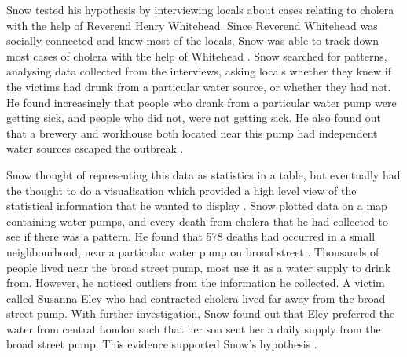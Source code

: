 \documentclass[12pt]{article}
\begin{document}
Snow tested his hypothesis by interviewing locals about cases relating to cholera with the help of Reverend Henry Whitehead. Since Reverend Whitehead was socially connected and knew most of the locals, Snow was able to track down most cases of cholera with the help of Whitehead \cite{tedtalk}. Snow searched for patterns, analysing data collected from the interviews, asking locals whether they knew if the victims had drunk from a particular water source, or whether they had not. He found increasingly that people who drank from a particular water pump were getting sick, and people who did not, were not getting sick. He also found out that a brewery and workhouse both located near this pump had independent water sources escaped the outbreak \cite{blog}.

Snow thought of representing this data as statistics in a table, but eventually had the thought to do a visualisation which provided a high level view of the statistical information that he wanted to display \cite{tedtalk}. Snow plotted data on a map containing water pumps, and every death from cholera that he had collected to see if there was a pattern. He found that 578 deaths had occurred in a small neighbourhood, near a particular water pump on broad street \cite{channel1}. Thousands of people lived near the broad street pump, most use it as a water supply to drink from. However, he noticed outliers from the information he collected. A victim called Susanna Eley who had contracted cholera lived far away from the broad street pump. With further investigation, Snow found out that Eley preferred the water from central London such that her son sent her a daily supply from the broad street pump. This evidence supported Snow's hypothesis \cite{channel1}. 



\end{document}
